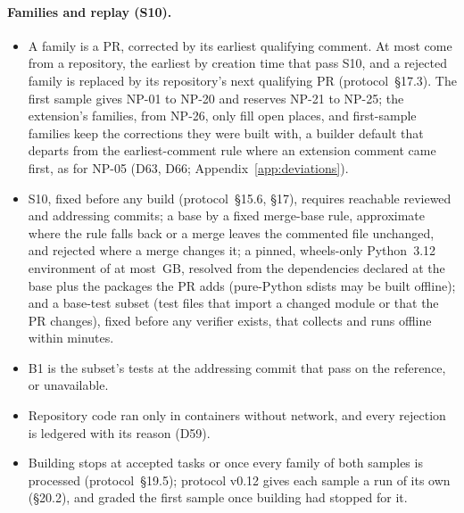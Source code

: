 \paragraph{Families and replay (S10).}
\begin{itemize}
\item A family is a PR, corrected by its earliest qualifying comment. At most  come from a
  repository, the earliest by creation time that pass S10, and a rejected family is replaced by its repository's next
  qualifying PR (protocol~\S17.3). The first sample gives NP-01 to NP-20 and reserves NP-21 to NP-25; the extension's
  families, from NP-26, only fill open places, and first-sample families keep the corrections they were built with, a
  builder default that departs from the earliest-comment rule where an extension comment came first, as for NP-05 (D63,
  D66; Appendix~\ref{app:deviations}).
\item S10, fixed before any build (protocol~\S15.6, \S17), requires reachable reviewed and addressing commits; a base by
  a fixed merge-base rule, approximate where the rule falls back or a merge leaves the commented file unchanged, and
  rejected where a merge changes it; a pinned, wheels-only Python~3.12 environment of at most
  \,GB, resolved from the dependencies declared at the base plus the packages the PR adds
  (pure-Python sdists may be built offline); and a base-test subset (test files that import a changed module or that the
  PR changes), fixed before any verifier exists, that collects and runs offline within  minutes.
\item B1 is the subset's tests at the addressing commit that pass on the reference, or unavailable.
\item Repository code ran only in containers without network, and every rejection is ledgered with its reason (D59).
\item Building stops at  accepted tasks or once every family of both samples is processed
  (protocol~\S19.5); protocol v0.12 gives each sample a run of its own (\S20.2), and \texttt{\NATURALRUN} graded the
  first sample once building had stopped for it.
\end{itemize}

